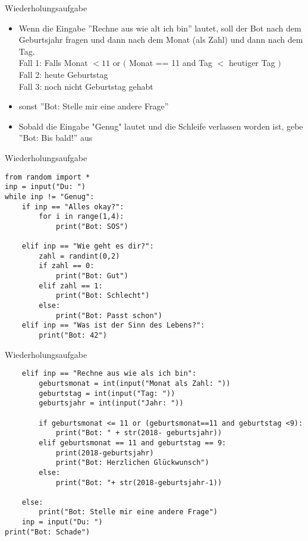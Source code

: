 \begin{frame}[fragile]{Wiederholungsaufgabe}

\begin{itemize}
	\item Wenn die Eingabe ''Rechne aus wie alt ich bin'' lautet, soll der Bot nach dem Geburtsjahr fragen und dann nach dem Monat (als Zahl) und dann nach dem Tag. \\Fall 1: Falls Monat $<11$ or $($ Monat == 11 and Tag $<$ heutiger Tag $)$ \\
	Fall 2: heute Geburtstag\\
	Fall 3: noch nicht Geburtstag gehabt
	\item sonst ''Bot: Stelle mir eine andere Frage'' 
	\item Sobald die Eingabe "Genug" lautet und die Schleife verlassen worden ist, gebe ''Bot: Bis bald!'' aus
	\end{itemize}
\end{frame}

\begin{frame}[fragile]{Wiederholungsaufgabe}
\begin{lstlisting}
from random import *
inp = input("Du: ")
while inp != "Genug":
	if inp == "Alles okay?":
		for i in range(1,4):
			print("Bot: SOS")
			
	elif inp == "Wie geht es dir?":
		zahl = randint(0,2)
		if zahl == 0:
			print("Bot: Gut")
		elif zahl == 1:
			print("Bot: Schlecht")
		else:
			print("Bot: Passt schon")
	elif inp == "Was ist der Sinn des Lebens?":
		print("Bot: 42")
\end{lstlisting}
\end{frame}
\begin{frame}[fragile]{Wiederholungsaufgabe}
\begin{lstlisting}
	elif inp == "Rechne aus wie als ich bin":
		geburtsmonat = int(input("Monat als Zahl: "))
		geburtstag = int(input("Tag: "))
		geburtsjahr = int(input("Jahr: "))

		if geburtsmonat <= 11 or (geburtsmonat==11 and geburtstag <9):
			print("Bot: " + str(2018- geburtsjahr))
		elif geburtsmonat == 11 and geburtstag == 9:
			print(2018-geburtsjahr)
			print("Bot: Herzlichen Glückwunsch")
		else:
			print("Bot: "+ str(2018-geburtsjahr-1))

	else:
		print("Bot: Stelle mir eine andere Frage")
	inp = input("Du: ")
print("Bot: Schade")
\end{lstlisting}
\end{frame}
